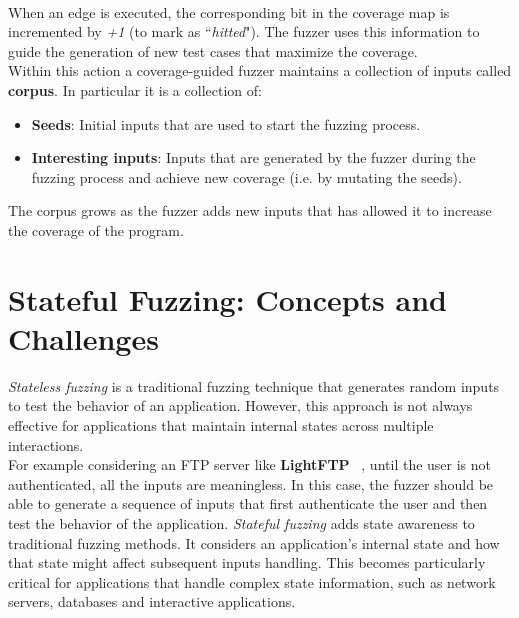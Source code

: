 \phantom{}\\
When an edge is executed, the corresponding bit in the coverage map is incremented by \textit{+1} (to mark as ``\textit{hitted}"). The fuzzer uses this information to guide the generation of new test cases that maximize the coverage.
\\Within this action a coverage-guided fuzzer maintains a collection of inputs called \textbf{corpus}. In particular it is a collection of:
\begin{itemize}
    \item \textbf{Seeds}: Initial inputs that are used to start the fuzzing process.
    \item \textbf{Interesting inputs}: Inputs that are generated by the fuzzer during the fuzzing process and achieve new coverage (i.e. by mutating the seeds).
\end{itemize}
The corpus grows as the fuzzer adds new inputs that has allowed it to increase the coverage of the program.

\section{Stateful Fuzzing: Concepts and Challenges}
\textit{Stateless fuzzing} is a traditional fuzzing technique that generates random inputs to test the behavior of an application. However, this approach is not always effective for applications that maintain internal states across multiple interactions.
\\For example considering an FTP server like \textbf{LightFTP} ~\cite{lightftp}, until the user is not authenticated, all the inputs are meaningless. In this case, the fuzzer should be able to generate a sequence of inputs that first authenticate the user and then test the behavior of the application.
\textit{Stateful fuzzing} adds state awareness to traditional fuzzing methods. It considers an application's internal state and how that state might affect subsequent inputs handling. This becomes particularly critical for applications that handle complex state information, such as network servers, databases and interactive applications.

